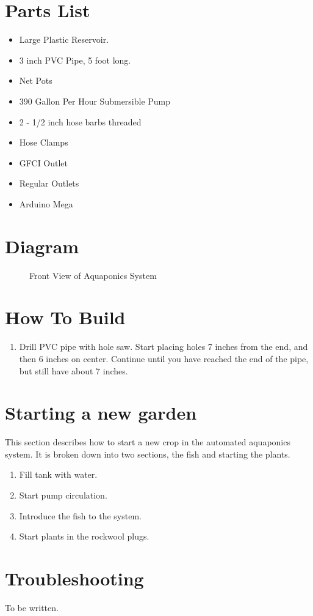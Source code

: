 \documentclass[american,man,12pt]{apa6}
\begin{document}
\section{Parts List}
\begin{itemize}
	\item Large Plastic Reservoir.
	\item 3 inch PVC Pipe, 5 foot long.
	\item Net Pots
	\item 390 Gallon Per Hour Submersible Pump
    \item 2 - 1/2 inch hose barbs threaded
    \item Hose Clamps
    \item GFCI Outlet
    \item Regular Outlets
    \item Arduino Mega
\end{itemize}

\section{Diagram}
\begin{figure}[h]
    \centering
    \caption{Front View of Aquaponics System}
    \label{fig:front view}
\end{figure}


\section{How To Build}
\begin{enumerate}
	\item Drill PVC pipe with hole saw. Start placing holes 7 inches from the
		  end, and then 6 inches on center. Continue until you have reached
		  the end of the pipe, but still have about 7 inches.
\end{enumerate}


\section{Starting a new garden}
This section describes how to start a new crop in the automated aquaponics
system. It is broken down into two sections, the fish and starting the plants.

\begin{enumerate}
	\item Fill tank with water.
	\item Start pump circulation.
	\item Introduce the fish to the system.
	\item Start plants in the rockwool plugs.
\end{enumerate}



\section{Troubleshooting}
To be written.


\printbibliography
\end{document}
